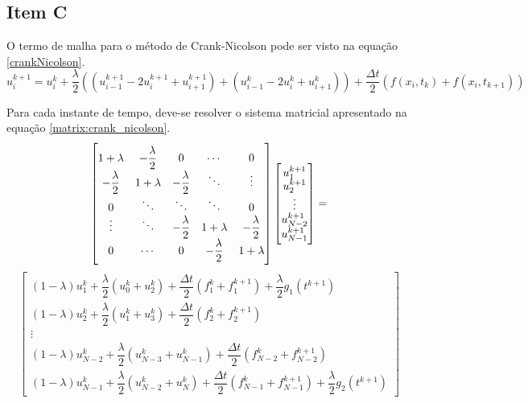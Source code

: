 \documentclass[12pt]{article}
\begin{document}
\begin{spacing}{1.5}
\subsection{Item C}

O termo de malha para o método de Crank-Nicolson pode ser visto na equação \eqref{crankNicolson}.
\begin{equation} \label{crankNicolson}
u_{i}^{k+1} = u_i^k + \dfrac{\lambda}{2}((u^{k+1}_{i-1} - 2u^{k+1}_{i} + u_{i+1}^{k+1}) + (u^{k}_{i-1} -2u^{k}_i + u^k_{i+1})) + \dfrac{\Delta t}{2}(f(x_i,t_k) + f(x_{i},t_{k+1}))
\end{equation}

Para cada instante de tempo, deve-se resolver o sistema matricial apresentado na equação \eqref{matrix:crank_nicolson}.
\begin{equation}\label{matrix:crank_nicolson}
    \renewcommand*{\arraystretch}{0.75}
    \begin{bmatrix}
    1+\lambda & -\dfrac{\lambda}{2} & 0 & \cdots & 0\\
    -\dfrac{\lambda}{2} & 1+\lambda & -\dfrac{\lambda}{2} & \ddots & \vdots\\
    0 & \ddots & \ddots & \ddots & 0 \\
    \vdots & \ddots & -\dfrac{\lambda}{2} & 1+\lambda & -\dfrac{\lambda}{2} \\
    0 & \cdots & 0 & -\dfrac{\lambda}{2} & 1+\lambda
    \end{bmatrix}
    \begin{bmatrix}
    u_1^{k+1} \\
    u_2^{k+1} \\
    \vdots \\
    u_{N-2}^{k+1} \\
    u_{N-1}^{k+1}
    \end{bmatrix}
    =
\end{equation}
\begin{equation*}
    \begin{bmatrix}
    (1-\lambda)u_1^k + \dfrac{\lambda}{2}(u_0^k + u_2^k) + \dfrac{\Delta t}{2}(f_1^{k}+f_1^{k+1}) + \dfrac{\lambda}{2} g_1(t^{k+1}) \\
    (1-\lambda)u_2^k + \dfrac{\lambda}{2}(u_1^k + u_3^k) + \dfrac{\Delta t}{2}(f_2^{k}+f_2^{k+1}) \\
    \vdots \\
    (1-\lambda)u_{N-2}^k + \dfrac{\lambda}{2}(u_{N-3}^k + u_{N-1}^k) + \dfrac{\Delta t}{2}(f_{N-2}^{k}+f_{N-2}^{k+1}) \\
    (1-\lambda)u_{N-1}^k + \dfrac{\lambda}{2}(u_{N-2}^k + u_{N}^k) + \dfrac{\Delta t}{2}(f_{N-1}^{k}+f_{N-1}^{k+1}) + \dfrac{\lambda}{2} g_2(t^{k+1})
    \end{bmatrix}
\end{equation*}


\end{spacing}
\end{document}
